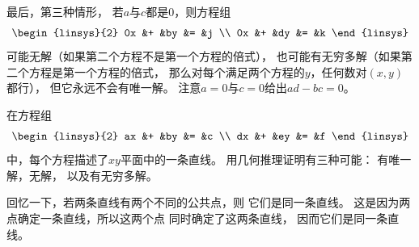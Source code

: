 \begin{exercises}
\begin{answer}
      最后，第三种情形，
      若\( a \)与\( c \)都是\( 0 \)，则方程组
      \begin{equation*}
        \begin{linsys}{2}
          0x  &+  &by  &=  &j  \\
          0x  &+  &dy  &=  &k  
        \end{linsys}
      \end{equation*}
      可能无解（如果第二个方程不是第一个方程的倍式），
      也可能有无穷多解（如果第二个方程是第一个方程的倍式，
      那么对每个满足两个方程的\( y \)，任何数对\( (x,y) \)都行），
      但它永远不会有唯一解。
      注意\( a=0 \)与\( c=0 \)给出\( ad-bc=0 \)。  
    \end{answer}
  \recommended \item 
    在方程组
    \begin{equation*}
      \begin{linsys}{2}
         ax  &+  &by  &=  &c  \\
         dx  &+  &ey  &=  &f  
      \end{linsys}
    \end{equation*}
    中，每个方程描述了\( xy \)平面中的一条直线。
    用几何推理证明有三种可能：
    有唯一解，无解，
    以及有无穷多解。
    \begin{answer}
      回忆一下，若两条直线有两个不同的公共点，则
      它们是同一条直线。
      这是因为两点确定一条直线，所以这两个点
      同时确定了这两条直线，
      因而它们是同一条直线。


\end{answer}
\end{exercises}
